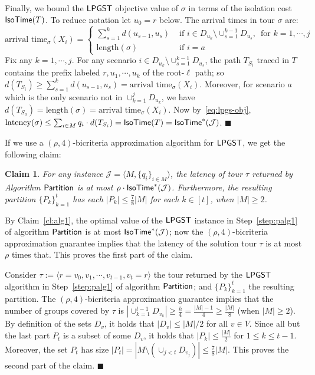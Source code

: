 \documentclass[11pt]{article}
\newtheorem{claim}[thm]{Claim}
\def\js{\ensuremath{\mathcal{J}}}
\def\palg{\ensuremath{{\sf Partition}}\xspace}
\def\isotime{\ensuremath{{\sf IsoTime}}}
\def\isoopt{{\isotime}^*}
\def\lpgst{\ensuremath{{\sf LPGST}}\xspace}
\newenvironment{pf}{

\noindent{\bf Proof:}} {\hfill$\blacksquare$


}
\begin{document}
\begin{pf}
Finally, we bound the \lpgst objective value of $\sigma$ in terms of the isolation cost $\isotime(T)$. To reduce notation let $u_0=r$ below. 
The arrival times in tour $\sigma$ are: 
$$ \mbox{arrival time}_\sigma(X_i) = \left\{
\begin{array}{ll}
\sum_{s=1}^k d(u_{s-1},u_s) & \mbox{ if }i \in D_{u_k} \setminus \cup_{s=1}^{k-1} D_{u_s},\, \mbox{ for }k=1,\cdots,j\\
\mbox{length}(\sigma) & \mbox{ if }i=a
\end{array}
\right.$$
Fix any $k=1,\cdots,j$. For any scenario $i\in D_{u_k}\setminus \cup_{s=1}^{k-1} D_{u_s}$,  the path $T_{S_i}$ traced in $T$ contains the prefix labeled $r,u_1,\cdots,u_k$ of the root-$\ell$ path; so $d(T_{S_i})\ge \sum_{s=1}^k d(u_{s-1},u_s) = \mbox{arrival time}_\sigma(X_i)$. Moreover, for scenario $a$ which is the only scenario not in $\cup_{k=1}^{j} D_{u_k}$,  we have $d(T_{S_a})=\mbox{length}(\sigma) = \mbox{arrival time}_\sigma(X_i)$. Now by~\eqref{eq:lpgs-obj}, $\mbox{latency}(\sigma)\le \sum_{i\in M} q_i\cdot d(T_{S_i})=\isotime(T)=\isoopt(\js)$. 
\end{pf}

\medskip\noindent If we use a $(\rho, 4)$-bicriteria approximation algorithm for \lpgst,
we get the following claim:
\begin{claim}
  \label{cl:alg4}
  For any instance $\js = \langle M, \{q_i\}_{i\in M}\rangle$, the
 latency of tour $\tau$ returned by Algorithm \palg is at most
  $\rho \cdot \isoopt(\js)$.
Furthermore, the resulting partition $\{P_k\}_{k=1}^t$ has each $|P_k| \leq \frac78
  |M|$ for each $k \in [t]$, when $|M|\ge 2$.
\end{claim}
\begin{pf} By Claim~\ref{cl:alg1}, the optimal value of the \lpgst instance in Step~\ref{step:palg1} of algorithm \palg is at
most $\isoopt(\js)$; now the $(\rho,4)$-bicriteria approximation guarantee 
 implies that the latency of the solution tour $\tau$ is at most $\rho$ times that. This proves the first part
of the claim.

Consider $\tau:= \langle r =v_0,v_1,\cdots,v_{t-1},v_t=r\rangle$ the tour returned by the \lpgst algorithm in
Step~\ref{step:palg1} of algorithm \palg; and $\{P_k\}_{k=1}^t$ the resulting partition. 
The $(\rho,4)$-bicriteria approximation guarantee implies  that the number of groups covered by $\tau$ is  $|\cup_{k=1}^{t-1} D_{v_k}|\ge \frac{h}4=
\frac{|M|-1}4\ge \frac{|M|}8$ (when $|M|\ge 2$). By definition of the sets $D_v$, it holds that $|D_v| \le |M|/2$ for
all $v\in V$. Since all but the last part $P_t$ is a  subset of some $D_v$, it holds that $|P_k|\le\frac{|M|}2$ for
$1\le k\le t-1$.  Moreover, the set $P_t$ has size $|P_t|=|M\setminus  (\cup_{j<t} D_{v_j})|\le \frac78 |M|$. This proves the second part of the claim.
\end{pf}
\end{document}
